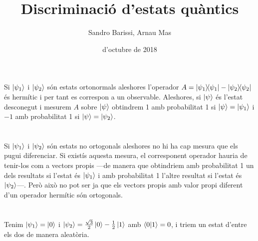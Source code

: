 \documentclass[12pt]{article}
\title{\sffamily {\bfseries Entrega 3:} Discriminació d'estats quàntics}
\author{\sffamily Sandro Barissi, Arnau Mas}
\date{\sffamily 31 d'octubre de 2018}
\numberwithin{table}{section}
\numberwithin{figure}{section}
\numberwithin{equation}{section}
\newcommand{\proj}[1]{\ketbra{#1}{#1}}
\begin{document}
\maketitle
\section{}
Si \( \ket{\psi_1} \) i \( \ket{\psi_2} \) són estats ortonormals aleshores l'operador \( A = \proj{\psi_1} - \proj{\psi_2} \) és hermític i per tant es correspon a un observable. Aleshores, si \( \ket{\psi} \) és l'estat desconegut i mesurem \( A \) sobre \( \ket{\psi} \) obtindrem 1 amb probabilitat 1 si \( \ket{\psi} = \ket{\psi_1} \) i \( -1 \) amb probabilitat 1 si \( \ket{\psi} = \ket{\psi_2} \).

\section{}
Si \( \ket{\psi_1} \) i \( \ket{\psi_2} \) són estats no ortogonals aleshores no hi ha cap mesura que els pugui diferenciar. Si existís aquesta mesura, el corresponent operador hauria de tenir-los com a vectors propis ---de manera que obtindriem amb probabilitat 1 un dels resultats si l'estat és \( \ket{\psi_1} \) i amb probabilitat 1 l'altre resultat si l'estat és \( \ket{\psi_2} \)---. Però això no pot ser ja que els vectors propis amb valor propi diferent d'un operador hermític són ortogonals. 

\section{}
Tenim \( \ket{\psi_1} = \ket{0} \) i \( \ket{\psi_2} = \frac{\sqrt{3}}{2}\ket{0} - \frac{1}{2}\ket{1} \) amb \( \braket{0}{1} = 0 \), i triem un estat d'entre els dos de manera aleatòria. 
\end{document}
